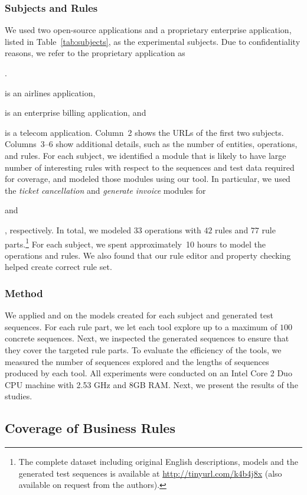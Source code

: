 \subsubsection{Subjects and Rules}

We used two open-source applications and a proprietary enterprise application,
listed in Table~\ref{tab:subjects}, as the experimental subjects. Due to
confidentiality reasons, we refer to the proprietary application as
\subject{App}. \subject{Cebu-pacific} is an airlines application,
\subject{jBilling} is an enterprise billing application, and \subject{App} is a
telecom application. Column~2 shows the URLs of the first two subjects.
Columns~3--6 show additional details, such as the number of entities,
operations, and rules. For each subject, we identified a module that is likely
to have large number of interesting rules with respect to the sequences and test
data required for coverage, and modeled those modules using our tool. In
particular, we used the \textit{ticket cancellation} and \textit{generate
  invoice} modules for \subject{Cebu-pacific} and \subject{jBilling},
respectively. In total, we modeled $33$ operations with $42$ rules and $77$ rule
parts.\footnote{\small The complete dataset including original English descriptions, models and the
  generated test sequences is available at \url{http://tinyurl.com/k4b4j8x}
  (also available on request from the authors).} For each subject, we spent
approximately~10 hours to model the operations and rules. We also found that
our rule editor and property checking helped create correct rule set.

\subsubsection{Method}

We applied \tool{} and \exhaust{} on the models created for each subject and
generated test sequences. For each rule part, we let each tool explore up to a
maximum of $100$ concrete sequences. Next, we inspected the generated sequences
to ensure that they cover the targeted rule parts. To evaluate the efficiency of
the tools, we measured the number of sequences explored and the lengths of
sequences produced by each tool.  All experiments were conducted on an Intel
Core 2 Duo CPU machine with 2.53 GHz and 8GB RAM. Next, we present the results
of the studies.

\subsection{Coverage of Business Rules}

